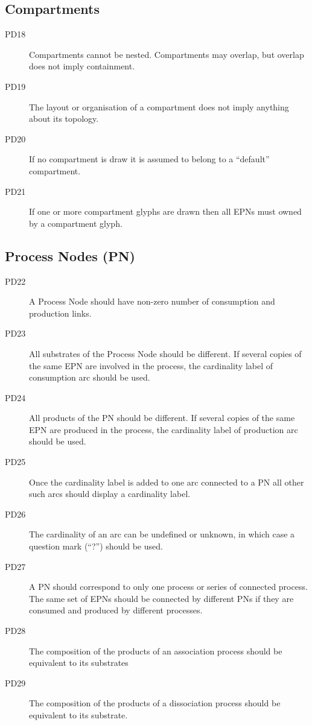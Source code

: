 \subsection{Compartments}

\begin{description}
\item[PD18] Compartments cannot be nested. Compartments may overlap, but overlap does not imply containment.
\item[PD19] The layout or organisation of a compartment does not imply anything about its topology.
\item[PD20] If no compartment is draw it is assumed to belong to a “default” compartment.
\item[PD21] If one or more compartment glyphs are drawn then all EPNs must owned by a compartment glyph.
\end{description}

\subsection{Process Nodes (PN)}

\begin{description}
\item[PD22] A Process Node should have non-zero number of consumption and production links.
\item[PD23] All substrates of the Process Node should be different. If several copies of the same EPN are involved in the process, the cardinality label of consumption arc should be used.
\item[PD24] All products of the PN should be different. If several copies of the same EPN are produced in the process, the cardinality label of production arc should be used.
\item[PD25] Once the cardinality label is added to one arc connected to a PN all other such arcs should display a cardinality label.
\item[PD26] The cardinality of an arc can be undefined or unknown, in which case a question mark (``?'') should be used.
\item[PD27] A PN should correspond to only one process or series of connected process. The same set of EPNs should be connected by different PNs if they are consumed and produced by different processes.
\item[PD28] The composition of the products of an association process should be equivalent to its substrates
\item[PD29] The composition of the products of a dissociation process should be equivalent to its substrate.
\end{description}

